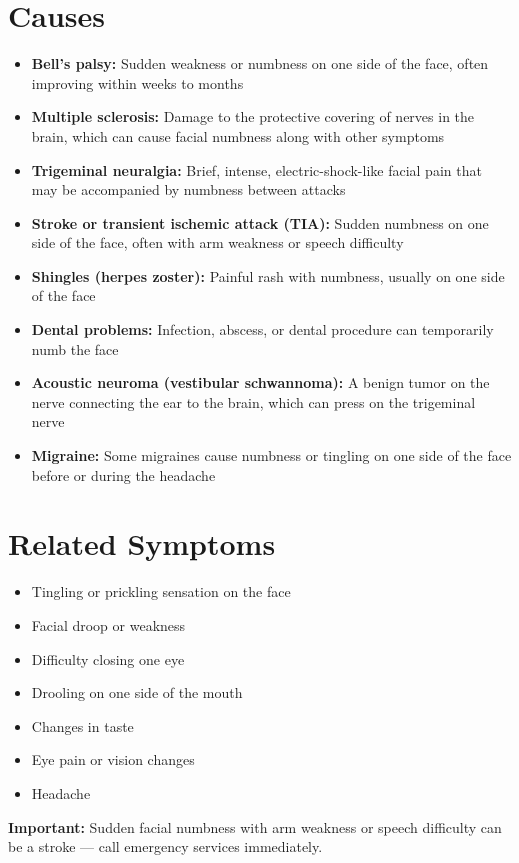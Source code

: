 \section*{Causes}
\begin{itemize}
  \item \textbf{Bell's palsy:} Sudden weakness or numbness on one side of the face, often improving within weeks to months
  \item \textbf{Multiple sclerosis:} Damage to the protective covering of nerves in the brain, which can cause facial numbness along with other symptoms
  \item \textbf{Trigeminal neuralgia:} Brief, intense, electric-shock-like facial pain that may be accompanied by numbness between attacks
  \item \textbf{Stroke or transient ischemic attack (TIA):} Sudden numbness on one side of the face, often with arm weakness or speech difficulty
  \item \textbf{Shingles (herpes zoster):} Painful rash with numbness, usually on one side of the face
  \item \textbf{Dental problems:} Infection, abscess, or dental procedure can temporarily numb the face
  \item \textbf{Acoustic neuroma (vestibular schwannoma):} A benign tumor on the nerve connecting the ear to the brain, which can press on the trigeminal nerve
  \item \textbf{Migraine:} Some migraines cause numbness or tingling on one side of the face before or during the headache
\end{itemize}

\section*{Related Symptoms}
\begin{itemize}
  \item Tingling or prickling sensation on the face
  \item Facial droop or weakness
  \item Difficulty closing one eye
  \item Drooling on one side of the mouth
  \item Changes in taste
  \item Eye pain or vision changes
  \item Headache
\end{itemize}
\textbf{Important:} Sudden facial numbness with arm weakness or speech difficulty can be a stroke — call emergency services immediately.

